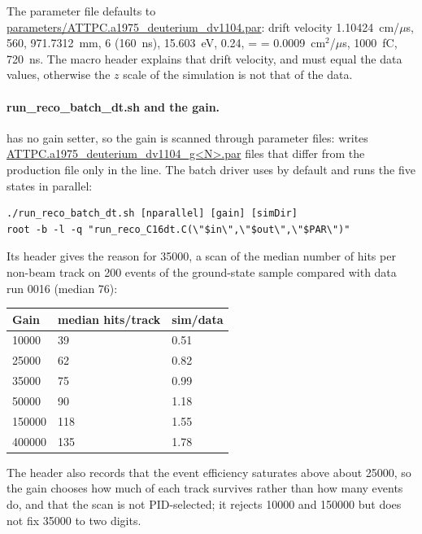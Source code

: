 The parameter file defaults to \url{parameters/ATTPC.a1975_deuterium_dv1104.par}: drift velocity
1.10424~cm/$\mu$s,  560,  971.7312~mm,  6
(160~ns),  15.603~eV,  0.24,  =  =
0.0009~cm$^2$/$\mu$s,  1000~fC,  720~ns. The macro header explains
that drift velocity,  and  must equal the data values, otherwise the
$z$ scale of the simulation is not that of the data.

\paragraph{run\_reco\_batch\_dt.sh and the gain.}  has no gain setter, so the gain is
scanned through parameter files:  writes
\url{ATTPC.a1975_deuterium_dv1104_g<N>.par} files that differ from the production file only in the
 line. The batch driver uses  by default and runs the five states in
parallel:

\begin{verbatim}
./run_reco_batch_dt.sh [nparallel] [gain] [simDir]
root -b -l -q "run_reco_C16dt.C(\"$in\",\"$out\",\"$PAR\")"
\end{verbatim}

Its header gives the reason for 35000, a scan of the median number of hits per non-beam track on 200
events of the ground-state sample compared with data run 0016 (median 76):

\begin{center}
\begin{tabular}{p{2.0cm}p{3.6cm}p{2.0cm}}
\toprule
Gain & median hits/track & sim/data \\
\midrule
10000 & 39 & 0.51 \\
25000 & 62 & 0.82 \\
35000 & 75 & 0.99 \\
50000 & 90 & 1.18 \\
150000 & 118 & 1.55 \\
400000 & 135 & 1.78 \\
\bottomrule
\end{tabular}
\end{center}

The header also records that the event efficiency saturates above about 25000, so the gain chooses
how much of each track survives rather than how many events do, and that the scan is not
PID-selected; it rejects 10000 and 150000 but does not fix 35000 to two digits.

